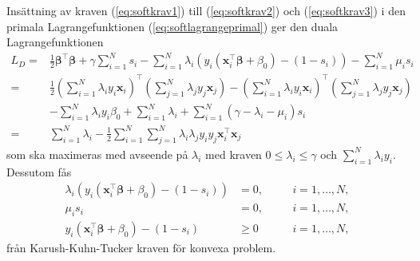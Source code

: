 \documentclass[a4paper, 12pt]{report}
\theoremstyle{definition}
\theoremstyle{remark}
\newcommand{\bfbeta}{{\boldsymbol{\beta}}}
\begin{document}
Insättning av kraven (\ref{eq:softkrav1}) till (\ref{eq:softkrav2}) och (\ref{eq:softkrav3}) i den primala Lagrangefunktionen (\ref{eq:softlagrangeprimal}) ger den duala Lagrangefunktionen
\begin{align*}
	L_D = &\frac{1}{2}\bfbeta^\intercal\bfbeta + \gamma\sum_{i=1}^{N}s_i - \sum_{i=1}^{N}\lambda_i\left(y_i\left(\mathbf{x}_i^\intercal\bfbeta+\beta_0\right)-\left(1-s_i\right)\right) - \sum_{i=1}^{N}\mu_is_i\\
	= &\frac{1}{2}\left(\sum_{i=1}^{N}\lambda_i y_i \mathbf{x}_i\right)^\intercal\left(\sum_{j=1}^{N}\lambda_j y_j \mathbf{x}_j\right) - \left(\sum_{i=1}^{N}\lambda_iy_i\mathbf{x}_i\right)^\intercal\left(\sum_{j=1}^{N}\lambda_j y_j \mathbf{x}_j\right)\\
	&-\sum_{i=1}^{N}\lambda_iy_i\beta_0 + \sum_{i=1}^{N}\lambda_i + \sum_{i=1}^{N}\left(\gamma - \lambda_i - \mu_i\right)s_i\\
	= &\sum_{i=1}^{N}\lambda_i - \frac{1}{2}\sum_{i=1}^{N}\sum_{j=1}^{N}\lambda_i\lambda_jy_iy_j\mathbf{x}_i^\intercal\mathbf{x}_j
\end{align*}
som ska maximeras med avseende på $\lambda_i$ med kraven $0\leq\lambda_i\leq\gamma$ och $\sum_{i=1}^{N}\lambda_iy_i$. Dessutom fås
\begin{align}
\label{eq:softkrav7}	\lambda_i\left( y_i\left(\mathbf{x}_i^\intercal\bfbeta + \beta_0\right) - \left(1-s_i\right)\right) &= 0, \quad & &i = 1,\dots,N,\\
\label{eq:softkrav8}	\mu_is_i&=0, \quad & &i = 1,\dots,N,\\
\label{eq:softkrav9}	y_i\left(\mathbf{x}_i^\intercal\bfbeta+\beta_0\right)-\left(1-s_i\right) &\geq 0 \quad & &i = 1,\dots,N,
\end{align}
från Karush-Kuhn-Tucker kraven för konvexa problem.
\end{document}
